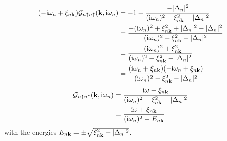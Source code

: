 \documentclass[../main.tex]{subfiles}
\begin{document}
\begin{align}
    (-\mathrm{i} \omega_n + \xi_{n \bm{\mathrm{k}}}) \mathcal{G}_{n \uparrow n \uparrow} (\bm{\mathrm{k}}, \mathrm{i} \omega_n) &= -1 + \frac{-\vert\Delta_{n}\vert^2}{(\mathrm{i} \omega_n)^2 - \xi_{n \bm{\mathrm{k}}}^2 - \vert\Delta_{n}\vert^2} \\
    &= \frac{-(\mathrm{i} \omega_n)^2 + \xi_{n \bm{\mathrm{k}}}^2 + \vert\Delta_{n}\vert^2 -\vert\Delta_{n}\vert^2}{(\mathrm{i} \omega_n)^2 - \xi_{n \bm{\mathrm{k}}}^2 - \vert\Delta_{n}\vert^2} \\
    &= \frac{-(\mathrm{i} \omega_n)^2 + \xi_{n \bm{\mathrm{k}}}^2}{(\mathrm{i} \omega_n)^2 - \xi_{n \bm{\mathrm{k}}}^2 - \vert\Delta_{n}\vert^2} \\
    &= \frac{(\mathrm{i} \omega_n + \xi_{n \bm{\mathrm{k}}})(-\mathrm{i} \omega_n + \xi_{n \bm{\mathrm{k}}})}{(\mathrm{i} \omega_n)^2 - \xi_{n \bm{\mathrm{k}}}^2 - \vert\Delta_{n}\vert^2}
\end{align}
\begin{align}
    \mathcal{G}_{n \uparrow n \uparrow} (\bm{\mathrm{k}}, \mathrm{i} \omega_n) &= \frac{\mathrm{i} \omega + \xi_{n \bm{\mathrm{k}}}}{(\mathrm{i} \omega_n)^2 - \xi_{n \bm{\mathrm{k}}}^2 - \vert\Delta_{n}\vert^2} \\
    &= \frac{\mathrm{i} \omega + \xi_{n \bm{\mathrm{k}}}}{(\mathrm{i} \omega_n)^2 - E_{n \bm{\mathrm{k}}}}
\end{align}
with the energies \(E_{n \bm{\mathrm{k}}} = \pm \sqrt{\xi_{n \bm{\mathrm{k}}}^2 + \vert\Delta_{n}\vert^2}\).
\end{document}
